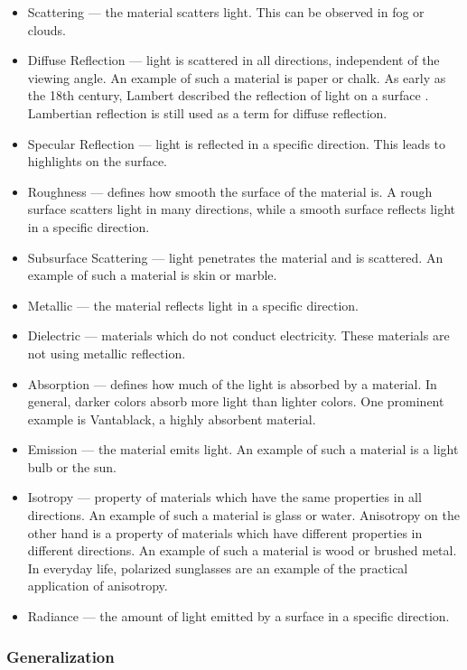 \begin{itemize}
  \item{Scattering} — the material scatters light. This can be observed in fog or clouds.
  \item{Diffuse Reflection} — light is scattered in all directions, independent of the viewing angle. An example of such a material is paper or chalk. As early as the 18th century, Lambert described the reflection of light on a surface \cite{lambert1760photometria}. Lambertian reflection is still used as a term for diffuse reflection.
  \item{Specular Reflection} — light is reflected in a specific direction. This leads to highlights on the surface.
  \item{Roughness} — defines how smooth the surface of the material is. A rough surface scatters light in many directions, while a smooth surface reflects light in a specific direction.
  \item{Subsurface Scattering} — light penetrates the material and is scattered. An example of such a material is skin or marble.
  \item{Metallic} — the material reflects light in a specific direction.
  \item{Dielectric} — materials which do not conduct electricity. These materials are not using metallic reflection.
  \item{Absorption} — defines how much of the light is absorbed by a material. In general, darker colors absorb more light than lighter colors. One prominent example is Vantablack, a highly absorbent material.
  \item{Emission} — the material emits light. An example of such a material is a light bulb or the sun.
  \item{Isotropy} — property of materials which have the same properties in all directions. An example of such a material is glass or water. Anisotropy on the other hand is a property of materials which have different properties in different directions. An example of such a material is wood or brushed metal. In everyday life, polarized sunglasses are an example of the practical application of anisotropy.
  \item{Radiance} — the amount of light emitted by a surface in a specific direction.
\end{itemize}

\subsubsection{Generalization}
\label{sec:physics-generalization}

